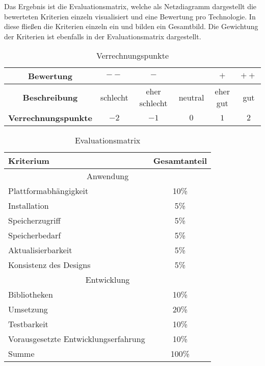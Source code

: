 Das Ergebnis ist die Evaluationsmatrix, welche als Netzdiagramm dargestellt die bewerteten Kriterien einzeln visualisiert und eine Bewertung pro Technologie. In diese fließen die Kriterien einzeln ein und bilden ein Gesamtbild. Die Gewichtung der Kriterien ist ebenfalls in der Evaluationsmatrix dargestellt.
\begin{table}[h!]
	\centering
	\begin{tabular}{|c|c|c|c|c|c|}
		\hline 	
			\textbf{Bewertung} & $--$ & $-$ & \Circle & $+$ & $++$ \\ 
		\hline 
			\textbf{Beschreibung} & schlecht & eher schlecht & neutral & eher gut & gut \\ 
		\hline 
			\textbf{Verrechnungspunkte} & $-2$ & $-1$ & $0$ & $1$ & $2$ \\ 
		\hline 		
	\end{tabular} 
	\caption{Verrechnungspunkte} \label{tab:verrechnungspunkte}
\end{table}

\begin{table}[h!]
	\centering
	\begin{tabular}{|l|c|}
		\hline
		Kriterium              & Gesamtanteil \\
		\hline
		\multicolumn{2}{c}{Anwendung}     \\
		\hline
		Plattformabhängigkeit   & 10\%         \\
		Installation           & 5\%          \\
		Speicherzugriff        & 5\%          \\
		Speicherbedarf         & 5\%          \\
		Aktualisierbarkeit     & 5\%          \\
		Konsistenz des Designs & 5\%         \\
		
		\hline
		\multicolumn{2}{c}{Entwicklung}     \\
		\hline
		Bibliotheken           & 10\%         \\
		Umsetzung              & 20\%         \\
		Testbarkeit            & 10\%         \\
		Vorausgesetzte Entwicklungserfahrung    & 10\%         \\
		\hline
		\hline
		Summe                  & 100\%        \\
		\hline
	\end{tabular}
	\caption{Evaluationsmatrix} \label{tab:punktekatalog}
\end{table}

